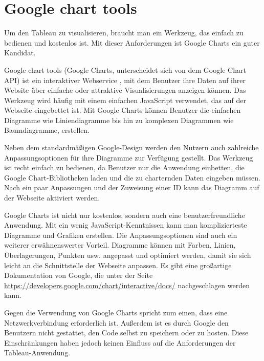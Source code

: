 \section{Google chart tools}
Um den Tableau zu visualisieren, braucht man ein Werkzeug, das einfach zu bedienen und kostenlos ist. Mit dieser Anforderungen ist Google Charts ein guter Kandidat.

Google chart tools \cite{googleCharts}(Google Charts, unterscheidet sich von dem Google Chart API) ist ein interaktiver Webservice \cite{googleChartswiki}, mit dem Benutzer ihre Daten auf ihrer Website über einfache oder attraktive Visualisierungen anzeigen können. Das Werkzeug wird häufig mit einem einfachen JavaScript verwendet, das auf der Webseite eingebettet ist. Mit Google Charts können Benutzer die einfachen Diagramme wie Liniendiagramme bis hin zu komplexen Diagrammen wie Baumdiagramme, erstellen. 

Neben dem standardmäßigen Google-Design werden den Nutzern auch zahlreiche Anpassungsoptionen für ihre Diagramme zur Verfügung gestellt. Das Werkzeug ist recht einfach zu bedienen, da Benutzer nur die Anwendung einbetten, die Google Chart-Bibliotheken laden und die zu charternden Daten eingeben müssen. Nach ein paar Anpassungen und der Zuweisung einer ID kann das Diagramm auf der Webseite aktiviert werden.

Google Charts ist nicht nur kostenlos, sondern auch eine benutzerfreundliche Anwendung. Mit ein wenig JavaScript-Kenntnissen kann man komplizierteste Diagramme und Grafiken erstellen. Die Anpassungsoptionen sind auch ein weiterer erwähnenswerter Vorteil. Diagramme können mit Farben, Linien, Überlagerungen, Punkten usw. angepasst und optimiert werden, damit sie sich leicht an die Schnittstelle der Webseite anpassen. Es gibt eine großartige Dokumentation von Google, die  unter der Seite \url{https://developers.google.com/chart/interactive/docs/} nachgeschlagen werden kann.

Gegen die Verwendung von Google Charts spricht zum einen, dass eine Netzwerkverbindung erforderlich ist. Außerdem ist es durch Google den Benutzern nicht gestattet, den Code selbst zu speichern oder zu hosten. Diese Einschränkungen haben jedoch keinen Einfluss auf die Anforderungen der Tableau-Anwendung.

